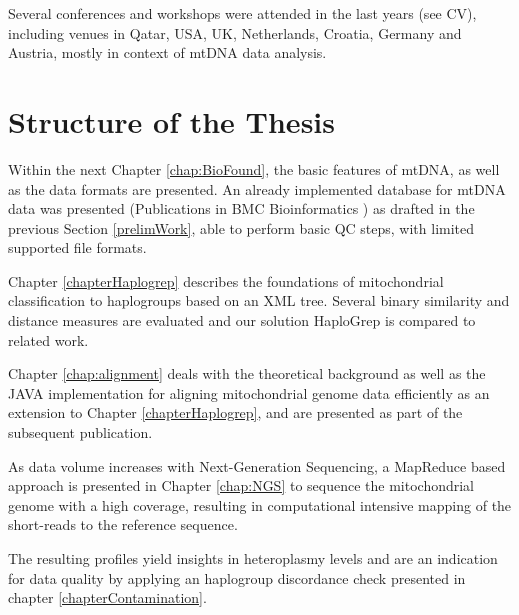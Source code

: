 Several conferences and workshops were attended in the last years (see CV), including venues in Qatar, USA, UK, Netherlands, Croatia, Germany and Austria, mostly in context of mtDNA data analysis. 

\section{Structure of the Thesis}
\label{sect:ProblChar}
Within the next Chapter \ref{chap:BioFound}, the basic features of mtDNA, as well as the data formats are presented. An already implemented database for mtDNA data was presented (Publications in BMC Bioinformatics \cite{Schoenherr2009, Weissensteiner2010}) as drafted in the previous Section \ref{prelimWork}, able to perform basic QC steps, with limited supported file formats.

Chapter \ref{chapterHaplogrep} describes the foundations of mitochondrial classification to haplogroups based on an XML tree. Several binary similarity and distance measures are evaluated and our solution HaploGrep is compared to related work. 


Chapter \ref{chap:alignment} deals with the theoretical background as well as the JAVA implementation for aligning mitochondrial genome data efficiently as an extension to Chapter \ref{chapterHaplogrep}, and are presented as part of the subsequent publication. 

As data volume increases with Next-Generation Sequencing, a MapReduce based approach is presented in Chapter \ref{chap:NGS} to sequence the mitochondrial genome with a high coverage, resulting in computational intensive mapping of the short-reads to the reference sequence. 

The resulting profiles yield insights in heteroplasmy levels and are an indication for data quality by applying an haplogroup discordance check presented in chapter \ref{chapterContamination}.


